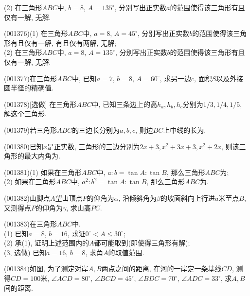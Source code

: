 (2) 在三角形$ABC$中, $b=8$, $A=135^\circ$, 分别写出正实数$a$的范围使得该三角形有且仅有一解, 无解.
\item (001376)(1) 在三角形$ABC$中, $a=8$, $A=45^\circ$, 分别写出正实数$b$的范围使得该三角形有且仅有一解, 有且仅有两解, 无解;\\ 
(2) 在三角形$ABC$中, $a=8$, $A=135^\circ$, 分别写出正实数$b$的范围使得该三角形有且仅有一解, 无解.
\item (001377)在三角形$ABC$中, 已知$a=7$, $b=8$, $A=60^\circ$, 求另一边$c$, 面积$S$以及外接圆半径的精确值.
\item (001378)[选做]
在三角形$ABC$中, 已知三条边上的高$h_a,h_b,h_c$分别为$1/3,1/4,1/5$, 解这个三角形.
\item (001379)若三角形$ABC$的三边长分别为$a,b,c$, 则边$BC$上中线的长为.
\item (001380)已知$x$是正实数, 三角形的三边分别为$2x+3,x^2+3x+3,x^2+2x$, 则该三角形的最大内角为.
\item (001381)(1) 如果在三角形$ABC$中, $a:b=\tan A:\tan B$, 那么三角形$ABC$为;\\ 
(2) 如果在三角形$ABC$中, $a^2:b^2=\tan A:\tan B$, 那么三角形$ABC$为.
\item (001382)山脚点$A$望山顶点$P$的仰角为$\alpha$, 沿倾斜角为$\beta$的坡面斜向上行进$a$米至点$B$, 又测得点$P$的仰角为$\gamma$, 求山高$PC$.
\item (001383)在三角形$ABC$中.\\ 
(1) 已知$a=8$, $b=16$, 求证$0^\circ<A\le 30^\circ$;\\ 
(2) 承(1), 证明上述范围内的$A$都可能取到(即使得三角形有解);\\ 
(3, 选做) 已知$a=16$, $b=8$, 求角$A$的取值范围.
\item (001384)如图, 为了测定对岸$A,B$两点之间的距离, 在河的一岸定一条基线$CD$, 测得$CD=100$米, $\angle ACD=80^\circ$, $\angle BCD=45^\circ$, $\angle BDC=70^\circ$, $\angle ADC=33^\circ$, 求$A,B$间的距离.\\ 
\begin{center}
\end{center}
